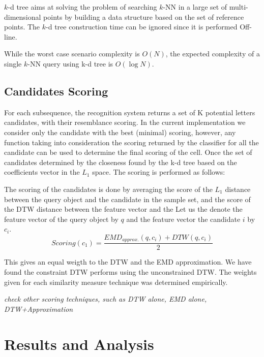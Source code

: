 \documentclass[10pt, conference, compsocconf]{IEEEtran}
\begin{document}
$k$-d tree aims at solving the problem of searching $k$-NN in a large set of multi-dimensional points by building a data structure based on the set of reference points.
The $k$-d tree construction time can be ignored since it is performed Off-line.

While the worst case scenario complexity is $O(N)$, the expected complexity of a single $k$-NN query using k-d tree is $O(\log N)$.

\subsection{Candidates Scoring}
For each subsequence, the recognition system returns a set of K potential letters candidates, with their resemblance scoring. 
In the current implementation we consider only the candidate with the best (minimal) scoring, however, any function taking into consideration the scoring returned by the classifier for all the candidate can be used to determine the final scoring of the cell.
Once the set of candidates determined by the closeness found by the k-d tree based on the coefficients vector in the $L_1$ space. The scoring is performed as follows:

The scoring of the candidates is done by averaging the score of the $L_1$ distance between the query object and the candidate in the sample set, and the score of the DTW distance between the feature vector and the 
Let us the denote the feature vector of the query object by $q$ and the feature vector the candidate $i$ by $c_i$.
\begin{equation}
Scoring(c_1)=\frac{EMD_{approx.}(q,c_i)+DTW(q,c_i)}{2} 
\end{equation}

This gives an equal weigth to the DTW and the EMD approximation.
We have found the constraint DTW performs using the unconstrained DTW.
The weights given for each similarity measure technique was determined empirically.

\emph{check other scoring techniques, such as DTW alone, EMD alone, DTW+Approximation}


\section{Results and Analysis}
\label{sec:results_analysis}

\end{document}
